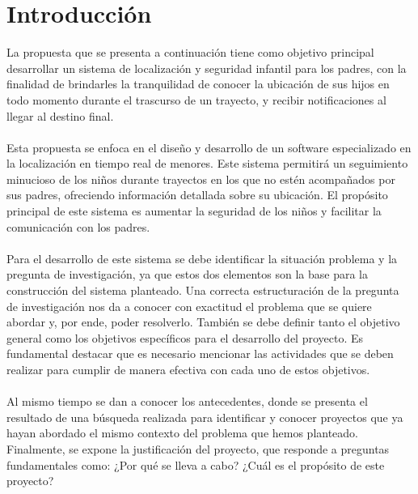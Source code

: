 \documentclass[12pt,onehalfspacing]{report}
\begin{document}
\section{Introducción}
\vspace{10pt}
La propuesta que se presenta a continuación tiene como objetivo principal desarrollar un sistema de localización y seguridad infantil para los padres, con la finalidad de brindarles la tranquilidad de conocer la ubicación de sus hijos en todo momento durante el trascurso de un trayecto, y recibir notificaciones al llegar al destino final.\\\\Esta propuesta se enfoca en el diseño y desarrollo de un software especializado en la localización en tiempo real de menores. Este sistema permitirá un seguimiento minucioso de los niños durante trayectos en los que no estén acompañados por sus padres, ofreciendo información detallada sobre su ubicación. El propósito principal de este sistema es aumentar la seguridad de los niños y facilitar la comunicación con los padres.\\\\Para el desarrollo de este sistema se debe identificar 
la situación problema y la pregunta de investigación, ya que estos dos elementos son la base para la construcción del sistema planteado. Una correcta estructuración de la pregunta de investigación nos da a conocer con exactitud el problema que se quiere abordar y, por ende, poder resolverlo.
También se debe definir tanto el objetivo general como los objetivos específicos para el desarrollo del proyecto. Es fundamental destacar que es necesario mencionar las actividades que se deben realizar para cumplir de manera efectiva con cada uno de estos objetivos.\\\\Al mismo tiempo se dan a conocer los antecedentes, donde se presenta el resultado de una búsqueda realizada para identificar y conocer proyectos que ya hayan abordado el mismo contexto del problema que hemos planteado. Finalmente, se expone la justificación del proyecto, que responde a preguntas fundamentales como: ¿Por qué se lleva a cabo? ¿Cuál es el propósito de este proyecto?\\\\
\end{document}
